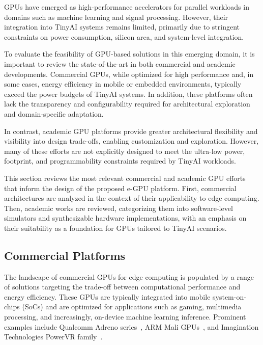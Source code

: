         GPUs have emerged as high-performance accelerators for parallel workloads in domains such as machine learning and signal processing. However, their integration into TinyAI systems remains limited, primarily due to stringent constraints on power consumption, silicon area, and system-level integration.
        
        To evaluate the feasibility of GPU-based solutions in this emerging domain, it is important to review the state-of-the-art in both commercial and academic developments. Commercial GPUs, while optimized for high performance and, in some cases, energy efficiency in mobile or embedded environments, typically exceed the power budgets of TinyAI systems. In addition, these platforms often lack the transparency and configurability required for architectural exploration and domain-specific adaptation.
        
        In contrast, academic GPU platforms provide greater architectural flexibility and visibility into design trade-offs, enabling customization and exploration. However, many of these efforts are not explicitly designed to meet the ultra-low power, footprint, and programmability constraints required by TinyAI workloads.
        
        This section reviews the most relevant commercial and academic GPU efforts that inform the design of the proposed \mbox{e-GPU} platform. First, commercial architectures are analyzed in the context of their applicability to edge computing. Then, academic works are reviewed, categorizing them into software-level simulators and synthesizable hardware implementations, with an emphasis on their suitability as a foundation for GPUs tailored to TinyAI scenarios.

        \subsection{Commercial Platforms}
        
            The landscape of commercial GPUs for edge computing is populated by a range of solutions targeting the trade-off between computational performance and energy efficiency. These GPUs are typically integrated into mobile system-on-chips (SoCs) and are optimized for applications such as gaming, multimedia processing, and increasingly, on-device machine learning inference. Prominent examples include Qualcomm Adreno series~\cite{qualcomm}, ARM Mali GPUs~\cite{arm}, and Imagination Technologies PowerVR family~\cite{imagtech}.
            
